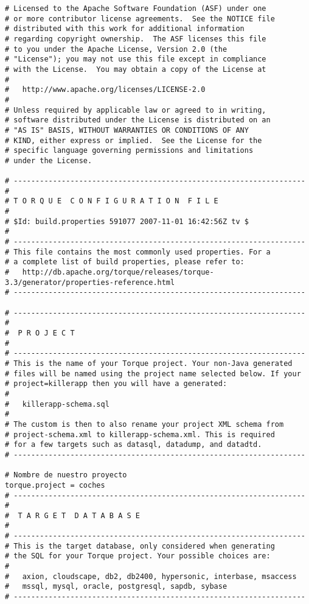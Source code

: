 \begin{lstlisting}
# Licensed to the Apache Software Foundation (ASF) under one
# or more contributor license agreements.  See the NOTICE file
# distributed with this work for additional information
# regarding copyright ownership.  The ASF licenses this file
# to you under the Apache License, Version 2.0 (the
# "License"); you may not use this file except in compliance
# with the License.  You may obtain a copy of the License at
#
#   http://www.apache.org/licenses/LICENSE-2.0
#
# Unless required by applicable law or agreed to in writing,
# software distributed under the License is distributed on an
# "AS IS" BASIS, WITHOUT WARRANTIES OR CONDITIONS OF ANY
# KIND, either express or implied.  See the License for the
# specific language governing permissions and limitations
# under the License.

# -------------------------------------------------------------------
#
# T O R Q U E  C O N F I G U R A T I O N  F I L E
#
# $Id: build.properties 591077 2007-11-01 16:42:56Z tv $
#
# -------------------------------------------------------------------
# This file contains the most commonly used properties. For a
# a complete list of build properties, please refer to:
#   http://db.apache.org/torque/releases/torque-3.3/generator/properties-reference.html
# -------------------------------------------------------------------

# -------------------------------------------------------------------
#
#  P R O J E C T
#
# -------------------------------------------------------------------
# This is the name of your Torque project. Your non-Java generated
# files will be named using the project name selected below. If your
# project=killerapp then you will have a generated:
#
#   killerapp-schema.sql
#
# The custom is then to also rename your project XML schema from
# project-schema.xml to killerapp-schema.xml. This is required
# for a few targets such as datasql, datadump, and datadtd.
# -------------------------------------------------------------------

# Nombre de nuestro proyecto
torque.project = coches
# -------------------------------------------------------------------
#
#  T A R G E T  D A T A B A S E
#
# -------------------------------------------------------------------
# This is the target database, only considered when generating
# the SQL for your Torque project. Your possible choices are:
#
#   axion, cloudscape, db2, db2400, hypersonic, interbase, msaccess
#   mssql, mysql, oracle, postgresql, sapdb, sybase
# -------------------------------------------------------------------


\end{lstlisting}

